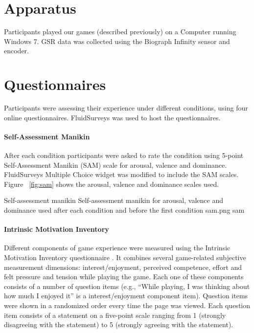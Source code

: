 \section{Apparatus}

Participants played our games (described previously) on a Computer running Windows 7. GSR data was collected using the Biograph Infinity sensor and encoder.

\section{Questionnaires}

Participants were assessing their experience under different conditions, using four online questionnaires. \textregistered FluidSurveys was used to host the questionnaires.

\paragraph{Self-Assessment Manikin} After each condition participants were asked to rate the condition using 5-point Self-Assessment Manikin (SAM) \cite{bradley1994measuring} scale for arousal, valence and dominance. \textregistered FluidSurveys Multiple Choice widget was modified to include the SAM scales. Figure ~\ref{fig:sam} shows the arousal, valence and dominance scales used.

\largeimg
{Self-assessment manikin}
{Self-assessment manikin for arousal, valence and dominance used after each condition and before the first condition}
{sam.png}
{sam}

\paragraph{Intrinsic Motivation Inventory} Different components of game experience were measured using the Intrinsic Motivation Inventory questionnaire \cite{ryan1983relation}. It combines several game-related subjective measurement dimensions: interest/enjoyment, perceived competence, effort and felt pressure and tension while playing the game. Each one of these components consists of a number of question items (e.g., ``While playing, I was thinking about how much I enjoyed it'' is a interest/enjoyment component item). Question items were shown in a randomized order every time the page was viewed. Each question item consists of a statement on a five-point scale ranging from 1 (strongly disagreeing with the statement) to 5 (strongly agreeing with the statement).


